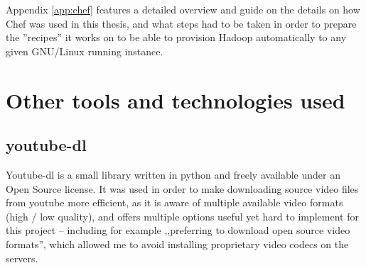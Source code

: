 Appendix \ref{app:chef} features a detailed overview and guide on the details on how Chef was used in this thesis, and what steps had to be taken in order to prepare the ''recipes'' it works on to be able to provision Hadoop automatically to any given GNU/Linux running instance.


\section{Other tools and technologies used}
\label{sec:other tools}

\subsection{youtube-dl}
Youtube-dl is a small library written in python and freely available under an Open Source license. 
It was used in order to make downloading source video files from youtube more efficient, as it is aware of multiple available video formats (high / low quality), and offers multiple options useful yet hard to implement for this project -- including for example ,,preferring to download open source video formats'', which allowed me to avoid installing proprietary video codecs on the servers.

%
%
